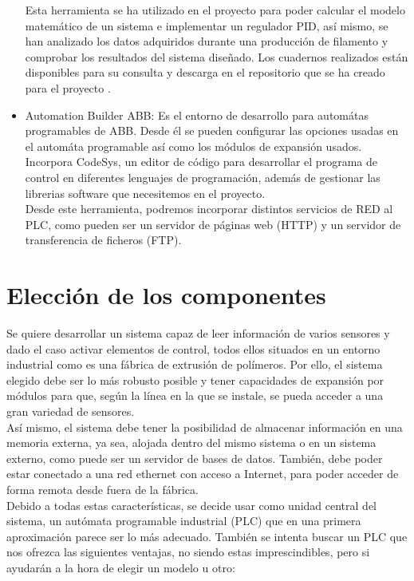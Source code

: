 \begin{itemize}
{Esta herramienta se ha utilizado en el proyecto para poder calcular el modelo matemático de un sistema e implementar un regulador PID, así mismo, se han analizado los datos adquiridos durante una producción de filamento y comprobar los resultados del sistema diseñado. Los cuadernos realizados están disponibles para su consulta y descarga en el repositorio que se ha creado para el proyecto \cite{githubTFG}.}

\item{Automation Builder ABB: 
Es el entorno de desarrollo para automátas programables de ABB. Desde él se pueden configurar las opciones usadas en el automáta programable así como los módulos de expansión usados. Incorpora CodeSys, un editor de código para desarrollar el programa de control en diferentes lenguajes de programación, además de gestionar las librerias software que necesitemos en el proyecto.\\

Desde este herramienta, podremos incorporar distintos servicios de RED al PLC, como pueden ser un servidor de páginas web (HTTP) y un servidor de transferencia de ficheros (FTP).}
\end{itemize}
\section{Elección de los componentes}

Se quiere desarrollar un sistema capaz de leer información de varios sensores y dado el caso activar elementos de control, todos ellos situados en un entorno industrial como es una fábrica de extrusión de polímeros. Por ello, el sistema elegido debe ser lo más robusto posible y tener capacidades de expansión por módulos para que, según la línea en la que se instale, se pueda acceder a una gran variedad de sensores.\\ 

Así mismo, el sistema debe tener la posibilidad de almacenar información en una memoria externa, ya sea, alojada dentro del mismo sistema o en un sistema externo, como puede ser un servidor de bases de datos. También, debe poder estar conectado a una red ethernet con acceso a Internet, para poder acceder de forma remota desde fuera de la fábrica.\\ 

Debido a todas estas características, se decide usar como unidad central del sistema, un autómata programable industrial (PLC) que en una primera aproximación parece ser lo más adecuado. También se intenta buscar un PLC que nos ofrezca las siguientes ventajas, no siendo estas imprescindibles, pero si ayudarán a la hora de elegir un modelo u otro:

